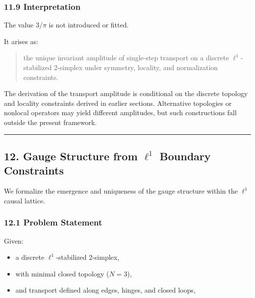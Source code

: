 \documentclass[
]{article}
\providecommand{\tightlist}{%
  \setlength{\itemsep}{0pt}\setlength{\parskip}{0pt}}
\begin{document}
\hypertarget{interpretation-2}{%
\subsubsection{11.9 Interpretation}\label{interpretation-2}}

The value \(3/\pi\) is not introduced or fitted.

It arises as:

\begin{quote}
the unique invariant amplitude of single-step transport on a discrete
\(\ell^1\)-stabilized 2-simplex under symmetry, locality, and
normalization constraints.
\end{quote}

The derivation of the transport amplitude is conditional on the discrete
topology and locality constraints derived in earlier sections.
Alternative topologies or nonlocal operators may yield different
amplitudes, but such constructions fall outside the present framework.

\begin{center}\rule{0.5\linewidth}{0.5pt}\end{center}

\hypertarget{gauge-structure-from-ell1-boundary-constraints}{%
\subsection{\texorpdfstring{12. Gauge Structure from \(\ell^1\) Boundary
Constraints}{12. Gauge Structure from \textbackslash ell\^{}1 Boundary Constraints}}\label{gauge-structure-from-ell1-boundary-constraints}}

We formalize the emergence and uniqueness of the gauge structure within
the \(\ell^1\) causal lattice.

\hypertarget{problem-statement-1}{%
\subsubsection{12.1 Problem Statement}\label{problem-statement-1}}

Given:

\begin{itemize}
\tightlist
\item
  a discrete \(\ell^1\)-stabilized 2-simplex,
\item
  with minimal closed topology (\(N = 3\)),
\item
  and transport defined along edges, hinges, and closed loops,
\end{itemize}
\end{document}
